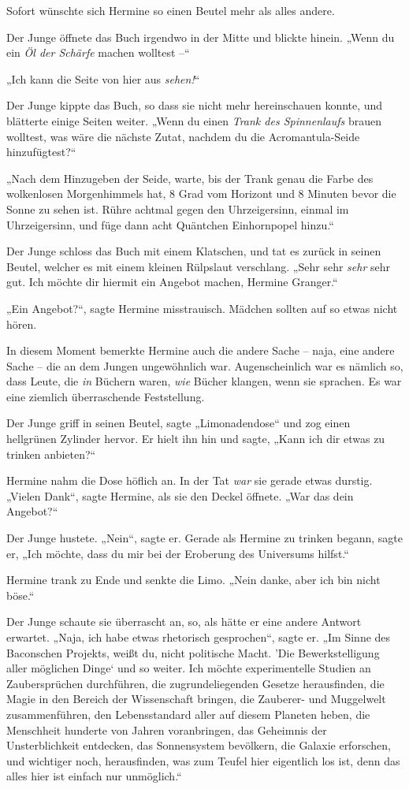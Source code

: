 {Sofort wünschte sich Hermine so einen Beutel mehr als alles andere.

Der Junge öffnete das Buch irgendwo in der Mitte und blickte hinein. „Wenn du ein \emph{Öl der Schärfe} machen wolltest --“

„Ich kann die Seite von hier aus \emph{sehen!}“

Der Junge kippte das Buch, so dass sie nicht mehr hereinschauen konnte, und blätterte einige Seiten weiter. „Wenn du einen \emph{Trank des Spinnenlaufs} brauen wolltest, was wäre die nächste Zutat, nachdem du die Acromantula-Seide hinzufügtest?“

„Nach dem Hinzugeben der Seide, warte, bis der Trank genau die Farbe des wolkenlosen Morgenhimmels hat, 8 Grad vom Horizont und 8 Minuten bevor die Sonne zu sehen ist. Rühre achtmal gegen den Uhrzeigersinn, einmal im Uhrzeigersinn, und füge dann acht Quäntchen Einhornpopel hinzu.“

Der Junge schloss das Buch mit einem Klatschen, und tat es zurück in seinen Beutel, welcher es mit einem kleinen Rülpslaut verschlang. „Sehr sehr \emph{sehr} sehr gut. Ich möchte dir hiermit ein Angebot machen, Hermine Granger.“

„Ein Angebot?“, sagte Hermine misstrauisch. Mädchen sollten auf so etwas nicht hören.

In diesem Moment bemerkte Hermine auch die andere Sache -- naja, eine andere Sache -- die an dem Jungen ungewöhnlich war. Augenscheinlich war es nämlich so, dass Leute, die \emph{in} Büchern waren, \emph{wie} Bücher klangen, wenn sie sprachen. Es war eine ziemlich überraschende Feststellung.

Der Junge griff in seinen Beutel, sagte „Limonadendose“ und zog einen hellgrünen Zylinder hervor. Er hielt ihn hin und sagte, „Kann ich dir etwas zu trinken anbieten?“

Hermine nahm die Dose höflich an. In der Tat \emph{war} sie gerade etwas durstig. „Vielen Dank“, sagte Hermine, als sie den Deckel öffnete. „War das dein Angebot?“

Der Junge hustete. „Nein“, sagte er. Gerade als Hermine zu trinken begann, sagte er, „Ich möchte, dass du mir bei der Eroberung des Universums hilfst.“

Hermine trank zu Ende und senkte die Limo. „Nein danke, aber ich bin nicht böse.“

Der Junge schaute sie überrascht an, so, als hätte er eine andere Antwort erwartet. „Naja, ich habe etwas rhetorisch gesprochen“, sagte er. „Im Sinne des Baconschen Projekts, weißt du, nicht politische Macht. 'Die Bewerkstelligung aller möglichen Dinge` und so weiter. Ich möchte experimentelle Studien an Zaubersprüchen durchführen, die zugrundeliegenden Gesetze herausfinden, die Magie in den Bereich der Wissenschaft bringen, die Zauberer- und Muggelwelt zusammenführen, den Lebensstandard aller auf diesem Planeten heben, die Menschheit hunderte von Jahren voranbringen, das Geheimnis der Unsterblichkeit entdecken, das Sonnensystem bevölkern, die Galaxie erforschen, und wichtiger noch, herausfinden, was zum Teufel hier eigentlich los ist, denn das alles hier ist einfach nur unmöglich.“

}
